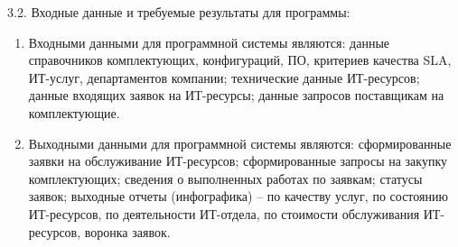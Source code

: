 {\parindent0pt
  3.2. Входные данные и требуемые результаты для программы:}

\begin{enumerate}
\item Входными данными для программной системы являются: данные
справочников комплектующих, конфигураций, ПО, критериев качества SLA,
ИТ-услуг, департаментов компании; технические данные ИТ-ресурсов; данные входящих заявок на ИТ-ресурсы; данные запросов поставщикам на комплектующие.
\item Выходными данными для программной системы являются: сформированные заявки на обслуживание ИТ-ресурсов; сформированные запросы на
закупку комплектующих; сведения о выполненных работах по заявкам; статусы заявок; выходные отчеты (инфографика) – по качеству услуг, по состоянию ИТ-ресурсов, по деятельности ИТ-отдела, по стоимости обслуживания
ИТ-ресурсов, воронка заявок.
\end{enumerate}

